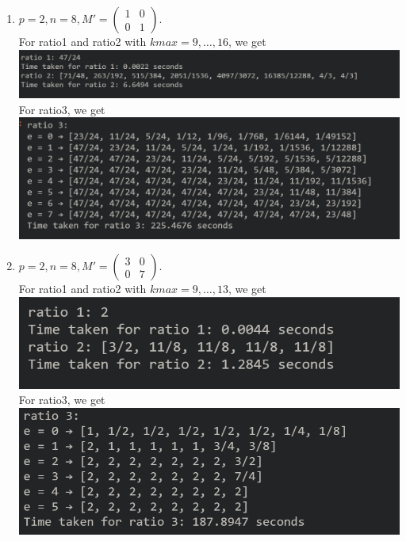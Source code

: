 \documentclass[letterpaper,12pt]{article}
\begin{document}
\begin{enumerate}
\item $p=2, n=8, M' = \begin{pmatrix}
1 & 0 \\ 0 & 1
\end{pmatrix}.$ \\
For ratio1 and ratio2 with $kmax = 9, \dots, 16$, we get \\
\includegraphics[scale=0.5]{ex3_1.png} \\
For ratio3, we get \\
\includegraphics[scale=0.5]{ex3_2.png}

\item $p=2, n=8, M' = \begin{pmatrix}
3 & 0 \\ 0 & 7
\end{pmatrix}.$ \\
For ratio1 and ratio2 with $kmax = 9, \dots, 13$, we get \\
\includegraphics[scale=0.5]{ex9_1.png} \\
For ratio3, we get \\
\includegraphics[scale=0.5]{ex9_2.png}


\end{enumerate}
\end{document}
